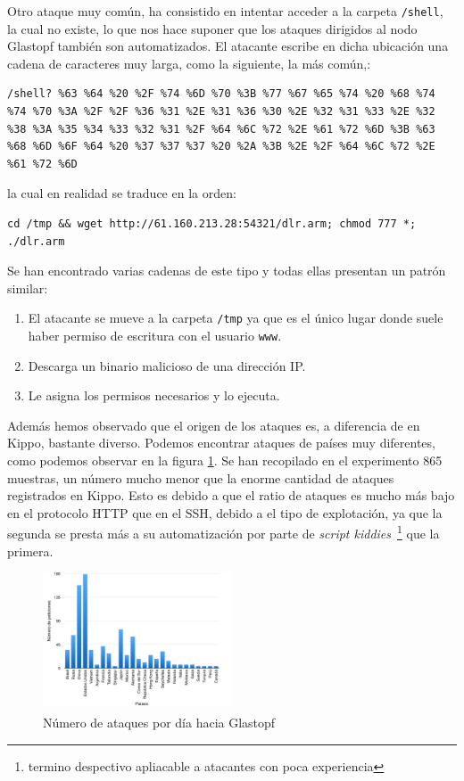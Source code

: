 \documentclass[journal]{IEEEtran}
\begin{document}
Otro ataque muy común, ha consistido en intentar acceder a la carpeta {\tt /shell}, la cual no existe, lo que nos hace suponer que los ataques dirigidos al nodo Glastopf también son automatizados. El atacante escribe en dicha ubicación una cadena de caracteres muy larga, como la siguiente, la más común,:

\begin{lstlisting}
/shell? %63 %64 %20 %2F %74 %6D %70 %3B %77 %67 %65 %74 %20 %68 %74 %74 %70 %3A %2F %2F %36 %31 %2E %31 %36 %30 %2E %32 %31 %33 %2E %32 %38 %3A %35 %34 %33 %32 %31 %2F %64 %6C %72 %2E %61 %72 %6D %3B %63 %68 %6D %6F %64 %20 %37 %37 %37 %20 %2A %3B %2E %2F %64 %6C %72 %2E %61 %72 %6D
\end{lstlisting}
la cual en realidad se traduce en la orden:
\lstset{basicstyle=\small\ttfamily, breaklines=true}
\begin{lstlisting}
cd /tmp && wget http://61.160.213.28:54321/dlr.arm; chmod 777 *; ./dlr.arm
\end{lstlisting}

Se han encontrado varias cadenas de este tipo y todas ellas presentan un patrón similar:
\begin{enumerate}
\item El atacante se mueve a la carpeta {\tt /tmp} ya que es el único lugar donde suele haber permiso de escritura con el usuario {\tt www}.
\item Descarga un binario malicioso de una dirección IP.
\item Le asigna los permisos necesarios y lo ejecuta.
\end{enumerate}

Además hemos observado que el origen de los ataques es, a diferencia de en Kippo, bastante diverso. Podemos encontrar ataques de países muy diferentes, como podemos observar en la figura \ref{fig:glastopf}. Se han recopilado en el experimento 865 muestras, un número mucho menor que la enorme cantidad de ataques registrados en Kippo. Esto es debido a que el ratio de ataques es mucho más bajo en el protocolo HTTP que en el SSH, debido a el tipo de explotación, ya que la segunda se presta más a su automatización por parte de {\it script kiddies}~\footnote{termino despectivo apliacable a atacantes con poca experiencia} que la primera.

\begin{figure}[H]
\centerline{
\includegraphics[width=0.5\textwidth]{img/glastopf}
}
\caption{Número de ataques por día hacia Glastopf}
\label{fig:glastopf}
\end{figure}
\end{document}
